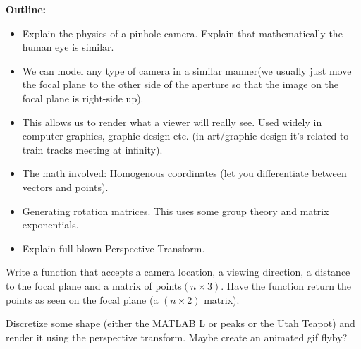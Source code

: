 

{\bf Outline:}

\begin{itemize}
\item Explain the physics of a pinhole camera. Explain that mathematically the human eye is similar.
\item We can model any type of camera in a similar manner(we usually just move the focal plane to the other side of the aperture so that the image on the focal plane is right-side up).
\item This allows us to render what a viewer will really see. Used widely in computer graphics, graphic design etc. (in art/graphic design it's related to train tracks meeting at infinity).
\item The math involved: Homogenous coordinates (let you differentiate between vectors and points).
\item Generating rotation matrices. This uses some group theory and matrix exponentials.
\item Explain full-blown Perspective Transform.
\end{itemize}

\begin{problem}
Write a function that accepts a camera location, a viewing direction, a distance to the focal plane and a matrix of points$(n\times 3)$. Have the function return the points as seen on the focal plane (a $(n\times 2)$ matrix).
\end{problem}

\begin{problem}
Discretize some shape (either the MATLAB L or peaks or the Utah Teapot) and render it using the perspective transform. Maybe create an animated gif flyby?
\end{problem}

